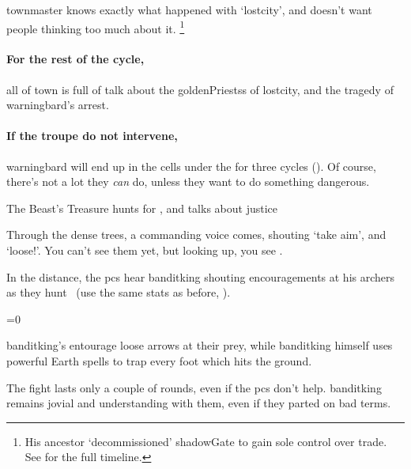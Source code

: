 \Gls{townmaster} knows exactly what happened with `\gls{lostcity}', and doesn't want people thinking too much about it.%
\footnote{His ancestor `decommissioned' \gls{shadowGate} to gain sole control over trade.
See  for the full timeline.}

\warningbard[\label{warningbard}]

\paragraph{For the rest of the \gls{cycle},}
all of \gls{town} is full of talk about the \glspl{goldenPriests} of \gls{lostcity}, and the tragedy of \gls{warningbard}'s arrest.


\paragraph{If the troupe do not intervene,}
\gls{warningbard} will end up in the cells under the  for three \glspl{cycle} (\pageref{guardstation}).
Of course, there's not a lot they \emph{can} do, unless they want to do something dangerous.

{The Beast's Treasure}%
{ hunts for , and talks about justice}%

\begin{boxtext}
  Through the dense trees, a commanding voice comes, shouting `take aim', and `loose!'.
  You can't see them yet, but looking up, you see \localMonster.
\end{boxtext}

In the distance, the \glspl{pc} hear \gls{banditking} shouting encouragements at his archers as they hunt \localMonster\ (use the same stats as before, ).

\banditking\label{banditking}

\ifnum\value{temperature}=0
  \griffin
\else
  \basilisk
\fi

\Gls{banditking}'s entourage loose arrows at their prey, while \gls{banditking} himself uses powerful Earth \glspl{spell} to trap every foot which hits the ground.

The fight lasts only a couple of \glspl{round}, even if the \glspl{pc} don't help.
\Gls{banditking} remains jovial and understanding with them, even if they parted on bad terms.

